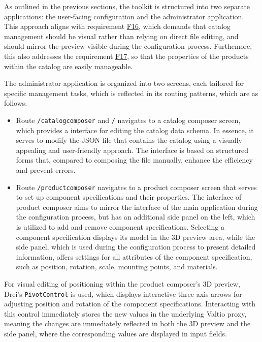 As outlined in the previous sections, the toolkit is structured into two separate applications: the user-facing configuration and the administrator application. This approach aligns with requirement \hyperref[itm:F16]{F16}, which demands that catalog management should be visual rather than relying on direct file editing, and should mirror the preview visible during the configuration process. Furthemore, this also addresses the requirement \hyperref[itm:F17]{F17}, so that the properties of the products within the catalog are easily manageable.

The administrator application is organized into two screens, each tailored for specific management tasks, which is reflected in its routing patterns, which are as follows:
\begin{itemize}[label=\rectanglebullet]
    \item Route \texttt{/catalogcomposer} and \texttt{/} navigates to a catalog composer screen, which provides a interface for editing the catalog data schema. In essence, it serves to modify the JSON file that contains the catalog using a visually appealing and user-friendly approach. The interface is based on structured forms that, compared to composing the file manually, enhance the efficiency and prevent errors. 
    
    \item Route \texttt{/productcomposer} navigates to a product composer screen that serves to set up component specifications and their properties. The interface of product composer aims to mirror the interface of the main application during the configuration process, but has an additional side panel on the left, which is utilized to add and remove component specifications. Selecting a component specification displays its model in the 3D preview area, while the side panel, which is used during the configuration process to present detailed information, offers settings for all attributes of the component specification, such as position, rotation, scale, mounting points, and materials.
\end{itemize} 
    
For visual editing of positioning within the product composer's 3D preview, Drei's \texttt{PivotControl} is used, which displays interactive three-axis arrows for adjusting position and rotation of the component specifications. Interacting with this control immediately stores the new values in the underlying Valtio proxy, meaning the changes are immediately reflected in both the 3D preview and the side panel, where the corresponding values are displayed in input fields. 

